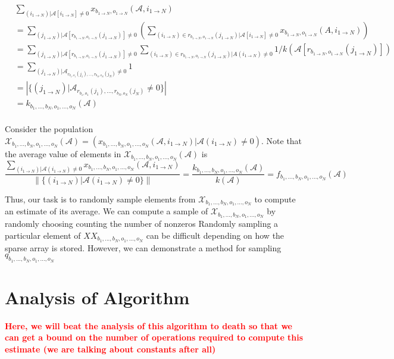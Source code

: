 \documentclass[12pt]{article}
\newcommand{\todo}[1] {\textbf{\textcolor{red}{#1}}}
\newcommand{\Ten}[1] {\mathbf{\mathcal{#1}}}
\newcommand{\Pop}[1] {\mathcal{#1}}
\begin{document}
    \begin{align*}
      &\sum\limits_{(i_{1 \to N}) | \Ten{A}[i_{1 \to N}] \neq 0} x_{b_{1 \to N}, o_{1 \to N}}(\Ten{A}, i_{1 \to N})\\ &= \sum\limits_{(j_{1 \to N}) | \Ten{A}[r_{b_{1 \to N}, o_{1 \to N}}(j_{1 \to N})] \neq 0} \left(\sum\limits_{(i_{1 \to N}) \in r_{b_{1 \to N}, o_{1 \to N}}(j_{1 \to N}) | \Ten{A}[i_{1 \to N}] \neq 0} x_{b_{1 \to N}, o_{1 \to N}}(A, i_{1 \to N})\right)\\
      &= \sum\limits_{(j_{1 \to N}) | \Ten{A}[r_{b_{1 \to N}, o_{1 \to N}}(j_{1 \to N})] \neq 0} \sum\limits_{(i_{1 \to N}) \in r_{b_{1 \to N}, o_{1 \to N}}(j_{1 \to N}) | A(i_{1 \to N}) \neq 0} 1/k(\Ten{A}[r_{b_{1 \to N}, o_{1 \to N}}(j_{1 \to N})])\\
      &= \sum\limits_{(j_{1 \to N}) | \Ten{A}_{r_{b_1, o_1}(j_1),  ..., r_{b_N, o_N}(j_N)} \neq 0} 1\\
      &= \left|\{(j_{1 \to N}) | \Ten{A}_{r_{b_1, o_1}(j_1),  ..., r_{b_N, o_N}(j_N)} \neq 0\}\right|\\
      &= k_{b_1, ..., b_N, o_1, ..., o_N}(\Ten{A})\\
    \end{align*}

    Consider the population $\Pop{X}_{b_1, ..., b_N, o_1, ..., o_N}(\Ten{A}) = \left(x_{b_1, ..., b_N, o_1, ..., o_N}(\Ten{A}, i_{1 \to N}) | \Ten{A}(i_{1 \to N}) \neq 0\right)$. Note that the average value of elements in $\Pop{X}_{b_1, ..., b_N, o_1, ..., o_N}(\Ten{A})$ is
    \[
      \frac{\sum\limits_{(i_{1 \to N}) | \Ten{A}(i_{1 \to N}) \neq 0} x_{b_1, ..., b_N, o_1, ..., o_N}(\Ten{A}, i_{1 \to N})}{\|\{(i_{1 \to N}) | \Ten{A}(i_{1 \to N}) \neq 0\}\|} = \frac{k_{b_1, ..., b_N, o_1, ..., o_N}(\Ten{A})}{k(\Ten{A})} = f_{b_1, ..., b_N, o_1, ..., o_N}(\Ten{A})
    \]

    Thus, our task is to randomly sample elements from $\Pop{X}_{b_1, ..., b_N, o_1, ..., o_N}$ to compute an estimate of its average. We can compute a sample of $\Pop{X}_{b_1, ..., b_N, o_1, ..., o_N}$ by randomly choosing counting the number of nonzeros  Randomly sampling a particular element of $X$$X_{b_1, ..., b_N, o_1, ..., o_N}$ can be difficult depending on how the sparse array is stored. However, we can demonstrate a method for sampling $q_{b_1, ..., b_N, o_1, ..., o_N}$


  \section{Analysis of Algorithm}
    \todo{Here, we will beat the analysis of this algorithm to death so that we can get a bound on the number of operations required to compute this estimate (we are talking about constants after all)}
\end{document}
